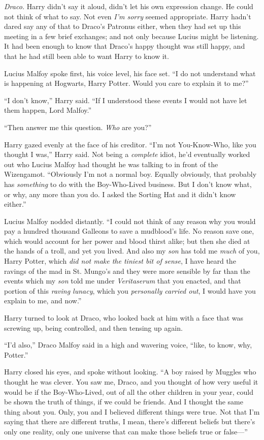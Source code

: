 \emph{Draco.} Harry didn’t say it aloud, didn’t let his own expression change. He could not think of what to say. Not even \emph{I’m sorry} seemed appropriate. Harry hadn’t dared say any of that to Draco’s Patronus either, when they had set up this meeting in a few brief exchanges; and not only because Lucius might be listening. It had been enough to know that Draco’s happy thought was still happy, and that he had still been able to want Harry to know it.

Lucius Malfoy spoke first, his voice level, his face set. “I do not understand what is happening at Hogwarts, Harry Potter. Would you care to explain it to me?”

“I don’t know,” Harry said. “If I understood these events I would not have let them happen, Lord Malfoy.”

“Then answer me this question. \emph{Who} are you?”

Harry gazed evenly at the face of his creditor. “I’m not You-Know-Who, like you thought I was,” Harry said. Not being a \emph{complete} idiot, he’d eventually worked out who Lucius Malfoy had thought he was talking to in front of the Wizengamot. “Obviously I’m not a normal boy. Equally obviously, that probably has \emph{something} to do with the Boy-Who-Lived business. But I don’t know what, or why, any more than you do. I asked the Sorting Hat and it didn’t know either.”

Lucius Malfoy nodded distantly. “I could not think of any reason why you would pay a hundred thousand Galleons to save a mudblood’s life. No reason save one, which would account for her power and blood thirst alike; but then she died at the hands of a troll, and yet you lived. And also my \emph{son} has told me \emph{much} of you, Harry Potter, which \emph{did not make the tiniest bit of sense}, I have heard the ravings of the mad in St. Mungo’s and they were more sensible by far than the events which my \emph{son} told me under \emph{Veritaserum} that you enacted, and that portion of this \emph{raving lunacy}, which you \emph{personally carried out}, I would have you explain to me, and now.”

Harry turned to look at Draco, who looked back at him with a face that was screwing up, being controlled, and then tensing up again.

“I’d also,” Draco Malfoy said in a high and wavering voice, “like, to know, why, Potter.”

Harry closed his eyes, and spoke without looking. “A boy raised by Muggles who thought he was clever. You saw me, Draco, and you thought of how very useful it would be if the Boy-Who-Lived, out of all the other children in your year, could be shown the truth of things, if we could be friends. And I thought the same thing about you. Only, you and I believed different things were true. Not that I’m saying that there are different truths, I mean, there’s different beliefs but there’s only one reality, only one universe that can make those beliefs true or false—”

